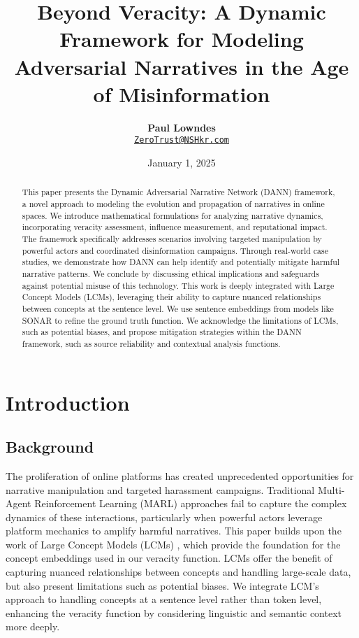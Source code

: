 \documentclass[12pt, a4paper]{article}
\title{\vspace{-2cm}\textbf{Beyond Veracity: A Dynamic Framework for Modeling Adversarial Narratives in the Age of Misinformation}}
\author{\textbf{Paul Lowndes} \\ \href{mailto:ZeroTrust@NSHkr.com}{\texttt{ZeroTrust@NSHkr.com}}}
\date{\small January 1, 2025}
\begin{document}
\maketitle
\vspace{-1.5em}


\begin{abstract}
This paper presents the Dynamic Adversarial Narrative Network (DANN) framework, a novel approach to modeling the evolution and propagation of narratives in online spaces. We introduce mathematical formulations for analyzing narrative dynamics, incorporating veracity assessment, influence measurement, and reputational impact. The framework specifically addresses scenarios involving targeted manipulation by powerful actors and coordinated disinformation campaigns. Through real-world case studies, we demonstrate how DANN can help identify and potentially mitigate harmful narrative patterns. We conclude by discussing ethical implications and safeguards against potential misuse of this technology. This work is deeply integrated with Large Concept Models (LCMs), leveraging their ability to capture nuanced relationships between concepts at the sentence level. We use sentence embeddings from models like SONAR to refine the ground truth function. We acknowledge the limitations of LCMs, such as potential biases, and propose mitigation strategies within the DANN framework, such as source reliability and contextual analysis functions.
\end{abstract}


\section{Introduction}
\subsection{Background}
The proliferation of online platforms has created unprecedented opportunities for narrative manipulation and targeted harassment campaigns. Traditional Multi-Agent Reinforcement Learning (MARL) approaches fail to capture the complex dynamics of these interactions, particularly when powerful actors leverage platform mechanics to amplify harmful narratives. This paper builds upon the work of Large Concept Models (LCMs) \cite{lcm_paper}, which provide the foundation for the concept embeddings used in our veracity function. LCMs offer the benefit of capturing nuanced relationships between concepts and handling large-scale data, but also present limitations such as potential biases. We integrate LCM's approach to handling concepts at a sentence level rather than token level, enhancing the veracity function by considering linguistic and semantic context more deeply.
\end{document}
